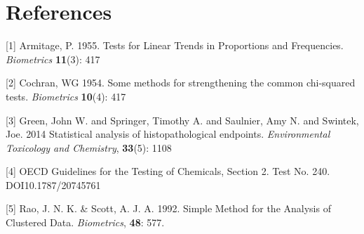 \documentclass[a4paper]{article}
\begin{document}
\section*{References}
\label{sec:References}
\thispagestyle{plain}

[1] Armitage, P. 1955. Tests for Linear Trends in Proportions and Frequencies. \textit{Biometrics} \textbf{11}(3): 417

[2] Cochran, WG 1954. Some methods for strengthening the common chi-squared tests. \textit{Biometrics}  \textbf{10}(4): 417

[3] Green, John W. and Springer, Timothy A. and Saulnier, Amy N. and Swintek, Joe. 2014 Statistical analysis of histopathological endpoints. 
\textit{Environmental Toxicology and Chemistry}, \textbf{33}(5): 1108

[4] OECD Guidelines for the Testing of Chemicals, Section 2. Test No. 240. DOI10.1787/20745761 

[5] Rao, J. N. K. & Scott, A. J. A. 1992. Simple Method for the Analysis of Clustered Data. \textit{Biometrics}, \textbf{48}: 577. 
\end{document}
